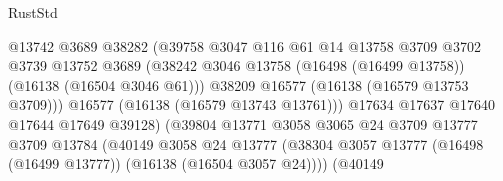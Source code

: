 \begin{lexlean}{RustStd}
\begin{coremodule}
                                            @13742
                                            @3689
                                            @38282
                                            (@39758
                                              @3047
                                              @116
                                              @61
                                              @14
                                              @13758
                                              @3709
                                              @3702
                                              @3739
                                              @13752
                                              @3689
                                              (@38242
                                                @3046
                                                @13758
                                                (@16498 (@16499 @13758))
                                                (@16138 (@16504 @3046 @61)))
                                              @38209
                                              @16577
                                              (@16138 (@16579 @13753 @3709)))
                                            @16577
                                            (@16138 (@16579 @13743 @13761)))
                                          @17634
                                          @17637
                                          @17640
                                          @17644
                                          @17649
                                          @39128)
                                        (@39804
                                          @13771
                                          @3058
                                          @3065
                                          @24
                                          @3709
                                          @13777
                                          @3709
                                          @13784
                                          (@40149
                                            @3058
                                            @24
                                            @13777
                                            (@38304
                                              @3057
                                              @13777
                                              (@16498 (@16499 @13777))
                                              (@16138 (@16504 @3057 @24))))
                                          (@40149

\end{coremodule}
\end{lexlean}
